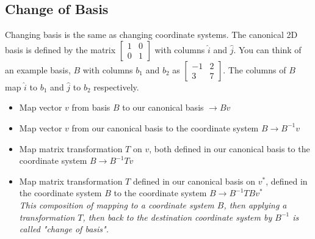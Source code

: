 \documentclass{article}
\begin{document}
\subsection{Change of Basis}
Changing basis is the same as changing coordinate systems. The canonical 2D basis is defined by the matrix $\begin{bmatrix}
    1 & 0 \\ 0 & 1
\end{bmatrix}$ with columns $\hat{i}$ and $\hat{j}$. You can think of an example basis, $B$ with columns $b_1$ and $b_2$ as $\begin{bmatrix}
    -1 & 2 \\ 3 & 7
\end{bmatrix}$. The columns of $B$ map $\hat{i}$ to $b_1$ and $\hat{j}$ to $b_2$ respectively.
\begin{itemize}
    \item Map vector $v$ from basis $B$ to our canonical basis $\rightarrow Bv$
    \item Map vector $v$ from our canonical basis to the coordinate system $B \rightarrow B^{-1}v$
    \item Map matrix transformation $T$ on $v$, both defined in our canonical basis to the coordinate system $B \rightarrow B^{-1}Tv$
    \item Map matrix transformation $T$ defined in our canonical basis on $v^*$, defined in the coordinate system $B$ to the coordinate system $B \rightarrow B^{-1}TBv^*$\\\textit{This composition of mapping to a coordinate system $B$, then applying a transformation $T$, then back to the destination coordinate system by $B^{-1}$ is called "change of basis".}
\end{itemize}
\end{document}

